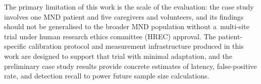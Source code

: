 The primary limitation of this work is the scale of the evaluation: the case study
involves one MND patient and five caregivers and volunteers, and its findings should not
be generalised to the broader MND population without a~multi-site trial under human
research ethics committee (HREC) approval. The patient-specific calibration protocol
and measurement infrastructure produced in this work are designed to support that trial
with minimal adaptation, and the preliminary case study results provide concrete
estimates of latency, false-positive rate, and detection recall to power future sample
size calculations.

